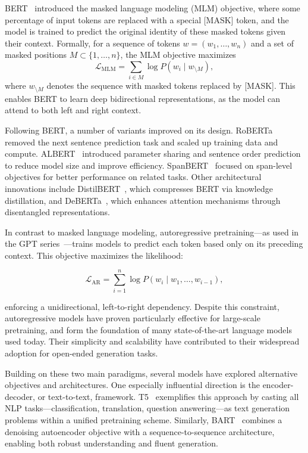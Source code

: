 BERT~\citep{devlin2019bert} introduced the masked language modeling (MLM) objective, where some percentage of input tokens are replaced with a special [MASK] token, and the model is trained to predict the original identity of these masked tokens given their context. Formally, for a sequence of tokens $w = (w_1, \ldots, w_n)$ and a set of masked positions $M \subset \{1, \ldots, n\}$, the MLM objective maximizes
\begin{equation}
    \mathcal{L}_{\text{MLM}} = \sum_{i \in M} \log P(w_i \mid w_{\setminus M}),
\end{equation}
where $w_{\setminus M}$ denotes the sequence with masked tokens replaced by [MASK]. This enables BERT to learn deep bidirectional representations, as the model can attend to both left and right context. 

Following BERT, a number of variants improved on its design. RoBERTa~\citep{liu2019roberta} removed the next sentence prediction task and scaled up training data and compute. ALBERT~\citep{lan2019albert} introduced parameter sharing and sentence order prediction to reduce model size and improve efficiency. SpanBERT~\citep{joshi2020spanbert} focused on span-level objectives for better performance on related tasks. Other architectural innovations include DistilBERT~\citep{sanh2019distilbert}, which compresses BERT via knowledge distillation, and DeBERTa~\citep{he2021deberta}, which enhances attention mechanisms through disentangled representations.

In contrast to masked language modeling, autoregressive pretraining—as used in the GPT series~\citep{radford2018gpt1, radford2019gpt2, brown2020gpt3}—trains models to predict each token based only on its preceding context. This objective maximizes the likelihood:

\begin{equation}
\mathcal{L}_{\text{AR}} = \sum_{i=1}^n \log P(w_i \mid w_1, \ldots, w_{i-1}),
\end{equation}

enforcing a unidirectional, left-to-right dependency. Despite this constraint, autoregressive models have proven particularly effective for large-scale pretraining, and form the foundation of many state-of-the-art language models used today. Their simplicity and scalability have contributed to their widespread adoption for open-ended generation tasks.

Building on these two main paradigms, several models have explored alternative objectives and architectures. One especially influential direction is the encoder-decoder, or text-to-text, framework. T5~\citep{raffel2020t5} exemplifies this approach by casting all NLP tasks—classification, translation, question answering—as text generation problems within a unified pretraining scheme. Similarly, BART~\citep{lewis2020bart} combines a denoising autoencoder objective with a sequence-to-sequence architecture, enabling both robust understanding and fluent generation.


